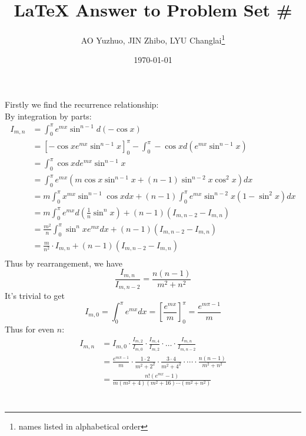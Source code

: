 \documentclass{article}
\title{\LaTeX{} Answer to Problem Set \#}
\author{AO Yuzhuo, JIN Zhibo, LYU Changlai\thanks{names listed in alphabetical order}}
\date{\today}
\begin{document}
\maketitle

\section{} %
Firstly we find the recurrence relationship:\\
By integration by parts:
\begin{align*}
    I_{m,n}&=\int_{0}^{\pi}e^{mx}\sin^{n-1}d(-\cos x)\\
    &=\left[-\cos x e^{mx}\sin ^{n-1}x\right]_0^{\pi}-
    \int_{0}^{\pi}-\cos x d(e^{mx}\sin ^{n-1}x)\\
    &=\int_{0}^{\pi}\cos x d e^{mx}\sin ^{n-1}x\\
    &=\int_{0}^{\pi}e^{mx}\left(m\cos x\sin ^{n-1}x+(n-1)\sin^{n-2}x\cos^2 x\right)dx\\
    &=m\int_{0}^{\pi}x^{mx}\sin ^{n-1}\cos x dx +(n-1)\int_{0}^{\pi}
    e^{mx}\sin^{n-2}x(1-\sin^2 x)dx\\
    &=m\int_{0}^{\pi}e^{mx}d\left(\frac{1}{n}\sin ^{n}x\right)+(n-1)(I_{m,n-2}-I_{m,n})\\
    &=\frac{m^2}{n}\int_{0}^{\pi}\sin ^n xe^{mx}dx+(n-1)(I_{m,n-2}-I_{m,n})\\
    &=\frac{m}{n^2}\cdot I_{m,n}+(n-1)(I_{m,n-2}-I_{m,n})\\
\end{align*}
Thus by rearrangement, we have
$$\frac{I_{m,n}}{I_{m,n-2}}=\frac{n(n-1)}{m^2+n^2}$$
It's trivial to get 
$$I_{m,0}=\int_{0}^{\pi}e^{mx}dx=\left[\frac{e^{mx}}{m}\right]^\pi_0=\frac{e^{m\pi-1}}{m}$$
Thus for even $n$:
\begin{align*}
    I_{m,n}&=I_{m,0}\cdot\frac{I_{m,2}}{I_{m,0}}\cdot\frac{I_{m,4}}{I_{m,2}}
    \cdot\dots\cdot\frac{I_{m,n}}{I_{m,n-2}}\\
    &=\frac{e^{m\pi-1}}{m}\cdot\frac{1\cdot 2}{m^2+2^2}\cdot
    \frac{3\cdot 4}{m^2+4^2}\cdot\cdots\cdot
    \frac{n(n-1)}{m^2+n^2}\\
    &=\frac{n!(e^{mx}-1)}{m(m^2+4)(m^2+16)\cdots(m^2+n^2)}
\end{align*}

\section{} %
\end{document}
